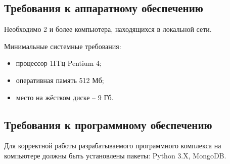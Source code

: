 \subsection {Требования к аппаратному обеспечению}

Необходимо 2 и более компьютера, находящихся в локальной сети.

Минимальные системные требования:

\begin{itemize}
\item процессор 1ГГц Pentium 4;
\item оперативная память 512 Мб;
\item место на жёстком диске -- 9 Гб.
\end{itemize}

\subsection {Требования к программному обеспечению}
Для корректной работы разрабатываемого программного комплекса на компьютере должны быть установлены пакеты: Python 3.X, MongoDB. 
